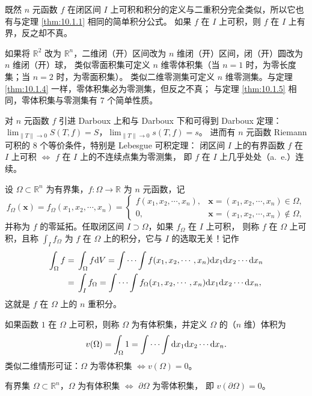 既然 $n$ 元函数 $f$ 在闭区间 $I$ 上可积和积分的定义与二重积分完全类似，所以它也有与定理 \ref{thm:10.1.1} 相同的简单积分公式。
如果 $f$ 在 $I$ 上可积，则 $f$ 在 $I$ 上有界，反之却不真。

如果将 $\mathbb{R}^2$ 改为 $\mathbb{R}^n$，二维闭（开）区间改为 $n$ 维闭（开）区间，闭（开）圆改为 $n$ 维闭（开）球，
类似零面积集可定义 $n$ 维零体积集（当 $n = 1$ 时，为零长度集；当 $n = 2$ 时，为零面积集）。
类似二维零测集可定义 $n$ 维零测集。与定理 \ref{thm:10.1.4} 一样，零体积集必为零测集，但反之不真；
与定理 \ref{thm:10.1.5} 相同，零体积集与零测集有 7 个简单性质。

对 $n$ 元函数 $f$ 引进 Darboux 上和与 Darboux 下和可得到 Darboux 定理：\linebreak
$\lim_{\|T\| \to 0} S(T, f) = S$，$\lim_{\|T\| \to 0} s(T, f) = s$。
进而有 $n$ 元函数 Riemann 可积的 8 个等价条件，特别是 Lebesgue 可积定理：
闭区间 $I$ 上的有界函数 $f$ 在 $I$ 上可积 $\Leftrightarrow$ $f$ 在 $I$ 上的不连续点集为零测集，
即 $f$ 在 $I$ 上几乎处处（a.~e.）连续。

设 $\Omega \subset \mathbb{R}^n$ 为有界集，$f\colon \Omega \to \mathbb{R}$ 为 $n$ 元函数，记
\[
f_{\Omega}(\boldsymbol{x}) = f_{\Omega}(x_1, x_2, \cdots, x_n) =
\begin{cases}
  f(x_1, x_2, \cdots, x_n), & \boldsymbol{x} = (x_1, x_2, \cdots, x_n) \in \Omega,\\
  0, & \boldsymbol{x} = (x_1, x_2, \cdots, x_n) \notin \Omega,
\end{cases}
\]
并称为 $f$ 的零延拓。任取闭区间 $I \supset \Omega$，如果 $f_{\Omega}$ 在 $I$ 上可积，
则称 $f$ 在 $\Omega$ 上可积，且称 $\int_{I} f_{\Omega}$ 为 $f$ 在 $\Omega$ 上的积分，它与 $I$ 的选取无关！记作
\[
\begin{aligned}
\int_{\Omega} f ={}& \int_{\Omega} f \mathrm{d}V
  = \idotsint f(x_1, x_2, \cdots, x_n) \mathrm{d}x_1 \mathrm{d}x_2 \cdots \mathrm{d}x_n\\
 ={}& \int_{I} f_{\Omega}
  = \idotsint f_{\Omega}(x_1, x_2, \cdots, x_n) \mathrm{d}x_1 \mathrm{d}x_2 \cdots \mathrm{d}x_n,
\end{aligned}
\]
这就是 $f$ 在 $\Omega$ 上的 $n$ 重积分。

如果函数 $1$ 在 $\Omega$ 上可积，则称 $\Omega$ 为有体积集，并定义 $\Omega$ 的（$n$ 维）体积为
\[
v(\Omega) = \int_{\Omega} 1 = \idotsint \mathrm{d}x_1 \mathrm{d}x_2 \cdots \mathrm{d}x_n.
\]
类似二维情形可证：$\Omega$ 为零体积集 $\Leftrightarrow v(\Omega) = 0$。

有界集 $\Omega \subset \mathbb{R}^n$，$\Omega$ 为有体积集 $\Leftrightarrow$ $\partial\Omega$ 为零体积集，
即 $v(\partial\Omega) = 0$。

